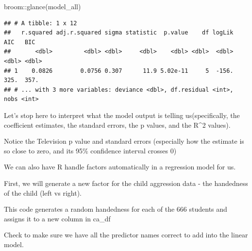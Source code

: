 \documentclass[
]{book}
\newenvironment{Shaded}{\begin{snugshade}}{\end{snugshade}}
\newcommand{\AttributeTok}[1]{\textcolor[rgb]{0.77,0.63,0.00}{#1}}
\newcommand{\ConstantTok}[1]{\textcolor[rgb]{0.00,0.00,0.00}{#1}}
\newcommand{\FloatTok}[1]{\textcolor[rgb]{0.00,0.00,0.81}{#1}}
\newcommand{\FunctionTok}[1]{\textcolor[rgb]{0.00,0.00,0.00}{#1}}
\newcommand{\NormalTok}[1]{#1}
\newcommand{\OtherTok}[1]{\textcolor[rgb]{0.56,0.35,0.01}{#1}}
\newcommand{\SpecialCharTok}[1]{\textcolor[rgb]{0.00,0.00,0.00}{#1}}
\newcommand{\StringTok}[1]{\textcolor[rgb]{0.31,0.60,0.02}{#1}}
\begin{document}
\begin{Shaded}
\begin{Highlighting}[]
\NormalTok{broom}\SpecialCharTok{::}\FunctionTok{glance}\NormalTok{(model\_all)}
\end{Highlighting}
\end{Shaded}

\begin{verbatim}
## # A tibble: 1 x 12
##   r.squared adj.r.squared sigma statistic  p.value    df logLik   AIC   BIC
##       <dbl>         <dbl> <dbl>     <dbl>    <dbl> <dbl>  <dbl> <dbl> <dbl>
## 1    0.0826        0.0756 0.307      11.9 5.02e-11     5  -156.  325.  357.
## # ... with 3 more variables: deviance <dbl>, df.residual <int>, nobs <int>
\end{verbatim}

Let's stop here to interpret what the model output is telling us(specifically, the coefficient estimates, the standard errors, the p values, and the R\^{}2 values).

Notice the Television p value and standard errors (especially how the estimate is so close to zero, and its 95\% confidence interval crosses 0)

We can also have R handle factors automatically in a regression model for us.

First, we will generate a new factor for the child aggression data - the handedness of the child (left vs right).

This code generates a random handedness for each of the 666 students and assigns it to a new column in ca\_df

\begin{Shaded}
\end{Shaded}

Check to make sure we have all the predictor names correct to add into the linear model.
\end{document}
